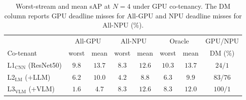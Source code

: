 \documentclass[runningheads]{llncs}
\newcommand{\Lcnn}{L1$_{\text{CNN}}$}
\newcommand{\Llm}{L2$_{\text{LM}}$}
\newcommand{\Lvlm}{L3$_{\text{VLM}}$}
\begin{document}
\begin{table}[tbp]
\centering
\caption{Worst-stream and mean sAP at $N{=}4$ under GPU co-tenancy. The DM column reports GPU deadline misses for All-GPU and NPU deadline misses for All-NPU (\%).}
\label{tab:main}
\footnotesize
\setlength{\tabcolsep}{5pt}
\begin{tabular}{lcc|cc|cc|c}
\toprule
 & \multicolumn{2}{c|}{All-GPU} & \multicolumn{2}{c|}{All-NPU} & \multicolumn{2}{c|}{Oracle} & GPU/NPU \\
Co-tenant & worst & mean & worst & mean & worst & mean & DM (\%) \\
\midrule
\Lcnn{} (ResNet50)   & $9.8$ & $13.7$ & $8.3$ & $12.6$ & $10.3$ & $13.7$ & $24 / 1$ \\
\Llm{} ($+$LLM)   & $6.2$ & $10.0$ & $4.2$ & $8.8$ & $6.3$ & $9.9$ & $83 / 76$ \\
\Lvlm{} ($+$VLM)  & $1.6$ & $4.7$ & $8.3$ & $12.6$ & $8.3$ & $12.0$ & $100 / 1$ \\
\bottomrule
\end{tabular}
\end{table}
\end{document}
